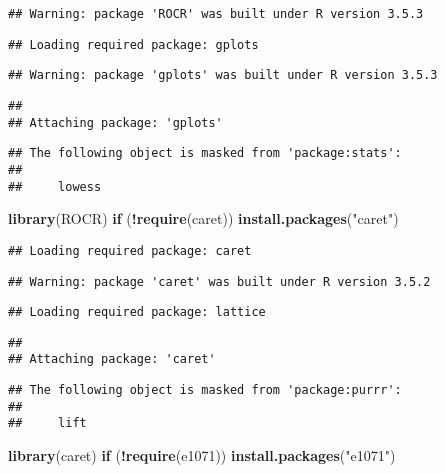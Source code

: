\documentclass[]{article}
\newenvironment{Shaded}{\begin{snugshade}}{\end{snugshade}}
\newcommand{\KeywordTok}[1]{\textcolor[rgb]{0.13,0.29,0.53}{\textbf{#1}}}
\newcommand{\StringTok}[1]{\textcolor[rgb]{0.31,0.60,0.02}{#1}}
\newcommand{\ControlFlowTok}[1]{\textcolor[rgb]{0.13,0.29,0.53}{\textbf{#1}}}
\newcommand{\OperatorTok}[1]{\textcolor[rgb]{0.81,0.36,0.00}{\textbf{#1}}}
\newcommand{\NormalTok}[1]{#1}
\begin{document}
\begin{verbatim}
## Warning: package 'ROCR' was built under R version 3.5.3
\end{verbatim}

\begin{verbatim}
## Loading required package: gplots
\end{verbatim}

\begin{verbatim}
## Warning: package 'gplots' was built under R version 3.5.3
\end{verbatim}

\begin{verbatim}
## 
## Attaching package: 'gplots'
\end{verbatim}

\begin{verbatim}
## The following object is masked from 'package:stats':
## 
##     lowess
\end{verbatim}

\begin{Shaded}
\begin{Highlighting}[]
\KeywordTok{library}\NormalTok{(ROCR)}
\ControlFlowTok{if}\NormalTok{ (}\OperatorTok{!}\KeywordTok{require}\NormalTok{(caret)) }\KeywordTok{install.packages}\NormalTok{(}\StringTok{"caret"}\NormalTok{)}
\end{Highlighting}
\end{Shaded}

\begin{verbatim}
## Loading required package: caret
\end{verbatim}

\begin{verbatim}
## Warning: package 'caret' was built under R version 3.5.2
\end{verbatim}

\begin{verbatim}
## Loading required package: lattice
\end{verbatim}

\begin{verbatim}
## 
## Attaching package: 'caret'
\end{verbatim}

\begin{verbatim}
## The following object is masked from 'package:purrr':
## 
##     lift
\end{verbatim}

\begin{Shaded}
\begin{Highlighting}[]
\KeywordTok{library}\NormalTok{(caret)}
\ControlFlowTok{if}\NormalTok{ (}\OperatorTok{!}\KeywordTok{require}\NormalTok{(e1071)) }\KeywordTok{install.packages}\NormalTok{(}\StringTok{"e1071"}\NormalTok{)}
\end{Highlighting}
\end{Shaded}
\end{document}
